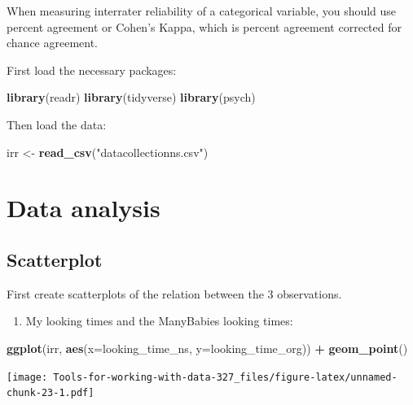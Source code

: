 \documentclass[
]{book}
\newenvironment{Shaded}{\begin{snugshade}}{\end{snugshade}}
\newcommand{\DataTypeTok}[1]{\textcolor[rgb]{0.13,0.29,0.53}{#1}}
\newcommand{\KeywordTok}[1]{\textcolor[rgb]{0.13,0.29,0.53}{\textbf{#1}}}
\newcommand{\NormalTok}[1]{#1}
\newcommand{\OperatorTok}[1]{\textcolor[rgb]{0.81,0.36,0.00}{\textbf{#1}}}
\newcommand{\StringTok}[1]{\textcolor[rgb]{0.31,0.60,0.02}{#1}}
\providecommand{\tightlist}{%
  \setlength{\itemsep}{0pt}\setlength{\parskip}{0pt}}
\begin{document}
When measuring interrater reliability of a categorical variable, you should use percent agreement or Cohen's Kappa, which is percent agreement corrected for chance agreement.

First load the necessary packages:

\begin{Shaded}
\begin{Highlighting}[]
\KeywordTok{library}\NormalTok{(readr)}
\KeywordTok{library}\NormalTok{(tidyverse)}
\KeywordTok{library}\NormalTok{(psych)}
\end{Highlighting}
\end{Shaded}

Then load the data:

\begin{Shaded}
\begin{Highlighting}[]
\NormalTok{irr <-}\StringTok{ }\KeywordTok{read_csv}\NormalTok{(}\StringTok{"datacollectionns.csv"}\NormalTok{) }
\end{Highlighting}
\end{Shaded}

\hypertarget{data-analysis}{%
\section{Data analysis}\label{data-analysis}}

\hypertarget{scatterplot}{%
\subsection{Scatterplot}\label{scatterplot}}

First create scatterplots of the relation between the 3 observations.

\begin{enumerate}
\def\labelenumi{\arabic{enumi}.}
\tightlist
\item
  My looking times and the ManyBabies looking times:
\end{enumerate}

\begin{Shaded}
\begin{Highlighting}[]
\KeywordTok{ggplot}\NormalTok{(irr, }\KeywordTok{aes}\NormalTok{(}\DataTypeTok{x=}\NormalTok{looking_time_ns, }\DataTypeTok{y=}\NormalTok{looking_time_org)) }\OperatorTok{+}
\StringTok{  }\KeywordTok{geom_point}\NormalTok{()}
\end{Highlighting}
\end{Shaded}

\texttt{[image: Tools-for-working-with-data-327\_files/figure-latex/unnamed-chunk-23-1.pdf]}
\end{document}
